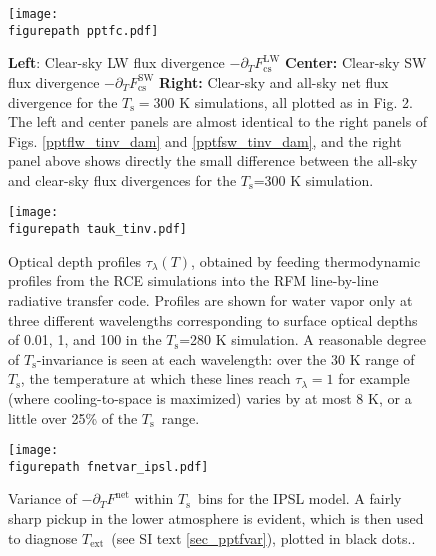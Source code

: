 \documentclass[11pt]{article}
\newcommand{\ppt}{\ensuremath{\partial_T}}
\newcommand{\FLWcs}{\ensuremath{F^\mathrm{LW}_{\mathrm{cs}}}}
\newcommand{\FSWcs}{\ensuremath{F^\mathrm{SW}_{\mathrm{cs}}}}
\newcommand{\Fnet}{\ensuremath{F^\mathrm{net}}}
\newcommand{\tauk}{\ensuremath{\tau_\lambda}}
\newcommand{\Ts}{\ensuremath{T_\mathrm{s}}}
\newcommand{\Text}{\ensuremath{T_\mathrm{ext}}}
\newcommand{\figurepath}{../../../figures/}
\begin{document}
\begin{figure}[h]
        \begin{center}
                        \texttt{[image: \\figurepath pptfc.pdf]}
                \caption{\textbf{Left}: Clear-sky LW flux divergence  $-\ppt \FLWcs$ \textbf{Center:} Clear-sky SW flux divergence  $-\ppt \FSWcs$  \textbf{Right:} Clear-sky and all-sky  net flux divergence for the $\Ts=300$ K simulations, all plotted as in Fig. 2. The left and center panels are almost identical to the right panels of Figs. \ref{pptflw_tinv_dam} and \ref{pptfsw_tinv_dam}, and the right panel above shows directly the small difference between the all-sky and clear-sky flux divergences for the \Ts=300 K simulation. 
                \label{pptfc}
                }
        \end{center}
\end{figure}


\begin{figure}[h]
        \begin{center}
                        \texttt{[image: \\figurepath tauk\_tinv.pdf]}
                \caption{Optical depth profiles $\tauk(T)$, obtained by feeding thermodynamic profiles from the RCE simulations  into the RFM line-by-line radiative transfer code. Profiles are shown for water vapor only at three different wavelengths corresponding to surface optical depths of 0.01, 1, and 100 in the \Ts=280 K simulation. A reasonable degree of \Ts-invariance is seen at each wavelength: over the 30 K range of \Ts,  the temperature at which these lines reach $\tauk=1$ for example (where cooling-to-space is maximized) varies by at most 8 K, or a little over 25\% of the \Ts\ range.
                \label{tauk_tinv}
                }
        \end{center}
\end{figure}



\begin{figure}[h]
        \begin{center}
                        \texttt{[image: \\figurepath fnetvar\_ipsl.pdf]}
                \caption{Variance of $-\ppt\Fnet$ within \Ts\ bins for the IPSL model. A fairly sharp pickup in the lower atmosphere is evident, which is then used to diagnose \Text\ (see SI text \ref{sec_pptfvar}), plotted in black dots.. 
                \label{fnetvar_ipsl}
                }
        \end{center}
\end{figure}
\end{document}
